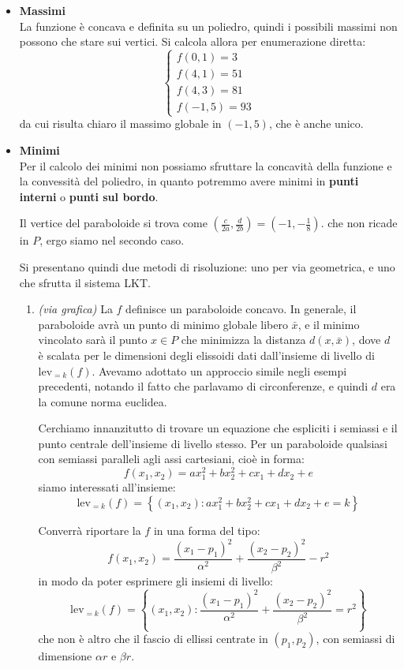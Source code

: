 \documentclass[a4paper,11pt]{article}
\begin{document}
\begin{itemize}
	\item \textbf{\textsf{Massimi}} \\
		La funzione è concava e definita su un poliedro, quindi i possibili massimi non possono che stare sui vertici.
		Si calcola allora per enumerazione diretta:
		\[
			\begin{cases}		
				f(0,1) = 3 \\ 
				f(4,1) = 51 \\ 
				f(4,3) = 81 \\
				f(-1, 5) = 93
			\end{cases}
		\]
		da cui risulta chiaro il massimo globale in $(-1, 5)$, che è anche unico.
	\item \textbf{\textsf{Minimi}} \\
		Per il calcolo dei minimi non possiamo sfruttare la concavità della funzione e la convessità del poliedro, in quanto potremmo avere minimi in \textbf{punti interni} o \textbf{punti sul bordo}.

		Il vertice del paraboloide si trova come $\left(\frac{c}{2a}, \frac{d}{2b}\right) = \left( -1, -\frac{1}{8} \right)$. che non ricade in $P$, ergo siamo nel secondo caso.

		Si presentano quindi due metodi di risoluzione: uno per via geometrica, e uno che sfrutta il sistema LKT.
		\begin{enumerate}
			\item \textit{(via grafica)} La $f$ definisce un paraboloide concavo.
				In generale, il paraboloide avrà un punto di minimo globale libero $\bar{x}$, e il minimo vincolato sarà il punto $x \in P$ che minimizza la distanza $d(x, \bar{x})$, dove $d$ è scalata per le dimensioni degli elissoidi dati dall'insieme di livello di $\mathrm{lev}_{=k}(f)$.
				Avevamo adottato un approccio simile negli esempi precedenti, notando il fatto che parlavamo di circonferenze, e quindi $d$ era la comune norma euclidea.
			
				Cerchiamo innanzitutto di trovare un equazione che espliciti i semiassi e il punto centrale dell'insieme di livello stesso.
				Per un paraboloide qualsiasi con semiassi paralleli agli assi cartesiani, cioè in forma:
				$$
				f(x_1, x_2) = ax_1^2 + bx_2^2 + cx_1 + dx_2 + e
				$$
				siamo interessati all'insieme:
				$$
				\mathrm{lev}_{=k} (f) = \left\{ (x_1, x_2) : ax_1^2 + bx_2^2 + cx_1 + dx_2 + e = k \right\}
				$$
				
				Converrà riportare la $f$ in una forma del tipo:
				$$
				f(x_1, x_2) = \frac{(x_1 - p_1)^2}{\alpha^2} + \frac{(x_2 - p_2)^2}{\beta^2} - r^2
				$$
				in modo da poter esprimere gli insiemi di livello:
				$$
				\mathrm{lev}_{=k} (f) = \left\{ (x_1, x_2) :  \frac{(x_1 - p_1)^2}{\alpha^2} + \frac{(x_2 - p_2)^2}{\beta^2} = r^2 \right\}
				$$
				che non è altro che il fascio di ellissi centrate in $(p_1, p_2)$, con semiassi di dimensione $\alpha r$ e $\beta r$.


\end{enumerate}
\end{itemize}
\end{document}
